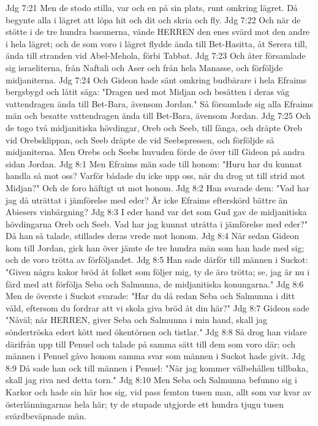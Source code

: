 Jdg 7:21  Men de stodo stilla, var och en på sin plats, runt omkring lägret. Då begynte alla i lägret att löpa hit och dit och skria och fly.
Jdg 7:22  Och när de stötte i de tre hundra basunerna, vände HERREN den enes svärd mot den andre i hela lägret; och de som voro i lägret flydde ända till Bet-Hasitta, åt Serera till, ända till stranden vid Abel-Mehola, förbi Tabbat.
Jdg 7:23  Och åter församlade sig israeliterna, från Naftali och Aser och från hela Manasse, och förföljde midjaniterna.
Jdg 7:24  Och Gideon hade sänt omkring budbärare i hela Efraims bergsbygd och låtit säga: "Dragen ned mot Midjan och besätten i deras väg vattendragen ända till Bet-Bara, ävensom Jordan." Så församlade sig alla Efraims män och besatte vattendragen ända till Bet-Bara, ävensom Jordan.
Jdg 7:25  Och de togo två midjanitiska hövdingar, Oreb och Seeb, till fånga, och dräpte Oreb vid Orebsklippan, och Seeb dräpte de vid Seebspressen, och förföljde så midjaniterna. Men Orebs och Seebs huvuden förde de över till Gideon på andra sidan Jordan.
Jdg 8:1  Men Efraims män sade till honom: "Huru har du kunnat handla så mot oss? Varför bådade du icke upp oss, när du drog ut till strid mot Midjan?" Och de foro häftigt ut mot honom.
Jdg 8:2  Han svarade dem: "Vad har jag då uträttat i jämförelse med eder? Är icke Efraims efterskörd bättre än Abiesers vinbärgning?
Jdg 8:3  I eder hand var det som Gud gav de midjanitiska hövdingarna Oreb och Seeb. Vad har jag kunnat uträtta i jämförelse med eder?" Då han så talade, stillades deras vrede mot honom.
Jdg 8:4  När sedan Gideon kom till Jordan, gick han över jämte de tre hundra män som han hade med sig; och de voro trötta av förföljandet.
Jdg 8:5  Han sade därför till männen i Suckot: "Given några kakor bröd åt folket som följer mig, ty de äro trötta; se, jag är nu i färd med att förfölja Seba och Salmunna, de midjanitiska konungarna."
Jdg 8:6  Men de överste i Suckot svarade: "Har du då redan Seba och Salmunna i ditt våld, eftersom du fordrar att vi skola giva bröd åt din här?"
Jdg 8:7  Gideon sade "Nåväl; när HERREN, giver Seba och Salmunna i min hand, skall jag söndertröska edert kött med ökentörnen och tistlar."
Jdg 8:8  Så drog han vidare därifrån upp till Penuel och talade på samma sätt till dem som voro där; och männen i Penuel gåvo honom samma svar som männen i Suckot hade givit.
Jdg 8:9  Då sade han ock till männen i Penuel: "När jag kommer välbehållen tillbaka, skall jag riva ned detta torn."
Jdg 8:10  Men Seba och Salmunna befunno sig i Karkor och hade sin här hos sig, vid pass femton tusen man, allt som var kvar av österlänningarnas hela här; ty de stupade utgjorde ett hundra tjugu tusen svärdbeväpnade män.
